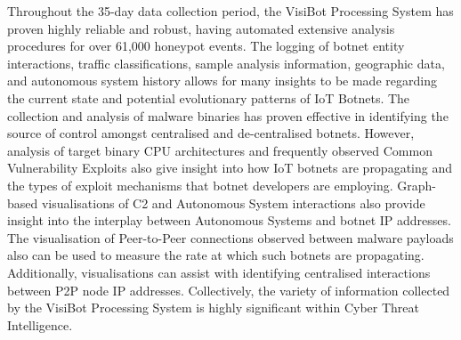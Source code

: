Throughout the 35-day data collection period, the VisiBot Processing System has proven highly reliable and robust, having automated extensive analysis procedures for over 61,000 honeypot events. The logging of botnet entity interactions, traffic classifications, sample analysis information, geographic data, and autonomous system history allows for many insights to be made regarding the current state and potential evolutionary patterns of IoT Botnets. The collection and analysis of malware binaries has proven effective in identifying the source of control amongst centralised and de-centralised botnets. However, analysis of target binary CPU architectures and frequently observed Common Vulnerability Exploits also give insight into how IoT botnets are propagating and the types of exploit mechanisms that botnet developers are employing. Graph-based visualisations of C2 and Autonomous System interactions also provide insight into the interplay between Autonomous Systems and botnet IP addresses. The visualisation of Peer-to-Peer connections observed between malware payloads also can be used to measure the rate at which such botnets are propagating. Additionally, visualisations can assist with identifying centralised interactions between P2P node IP addresses. Collectively, the variety of information collected by the VisiBot Processing System is highly significant within Cyber Threat Intelligence.